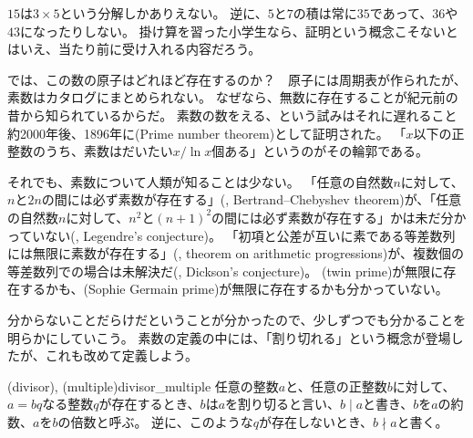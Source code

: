 $15$は$3\times5$という分解しかありえない。
逆に、$5$と$7$の積は常に$35$であって、$36$や$43$になったりしない。
掛け算を習った小学生なら、証明という概念こそないとはいえ、当たり前に受け入れる内容だろう。

では、この数の原子はどれほど存在するのか？　原子には周期表が作られたが、素数はカタログにまとめられない。
なぜなら、無数に存在することが紀元前の昔から知られているからだ。
素数の数をえる、という試みはそれに遅れること約2000年後、1896年に(Prime number theorem)として証明された。
「$x$以下の正整数のうち、素数はだいたい$x/\ln x$個ある」というのがその輪郭である。

それでも、素数について人類が知ることは少ない。
「任意の自然数$n$に対して、$n$と$2n$の間には必ず素数が存在する」(, Bertrand–Chebyshev theorem)が、「任意の自然数$n$に対して、$n^2$と$(n+1)^2$の間には必ず素数が存在する」かは未だ分かっていない(, Legendre's conjecture)。
「初項と公差が互いに素である等差数列には無限に素数が存在する」(, theorem on arithmetic progressions)が、複数個の等差数列での場合は未解決だ(, Dickson's conjecture)。
(twin prime)が無限に存在するかも、(Sophie Germain prime)が無限に存在するかも分かっていない。

分からないことだらけだということが分かったので、少しずつでも分かることを明らかにしていこう。
素数の定義の中には、「割り切れる」という概念が登場したが、これも改めて定義しよう。

\begin{Defi}{(divisor), (multiple)}{divisor_multiple}
任意の整数$a$と、任意の正整数$b$に対して、$a=bq$なる整数$q$が存在するとき、$b$は$a$を割り切ると言い、$b \mid a$と書き、$b$を$a$の約数、$a$を$b$の倍数と呼ぶ。
逆に、このような$q$が存在しないとき、$b \nmid a$と書く。
\end{Defi}

